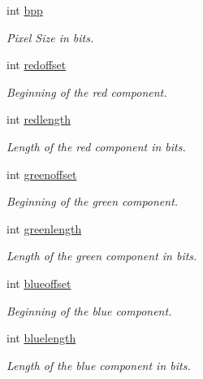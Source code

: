 \begin{DoxyCompactItemize}
\item 
int \hyperlink{structknoxremotedesktop_1_1PixelFormatDetail_a9557bebcc969ba20502ba9d377e085dc}{bpp}
\begin{DoxyCompactList}\small\item\em \-Pixel \-Size in bits. \end{DoxyCompactList}\item 
int \hyperlink{structknoxremotedesktop_1_1PixelFormatDetail_a5c1e26d5565b29732f007ab2f4c89357}{redoffset}
\begin{DoxyCompactList}\small\item\em \-Beginning of the red component. \end{DoxyCompactList}\item 
int \hyperlink{structknoxremotedesktop_1_1PixelFormatDetail_a370e9d8250b35b1f717a71a3737c73d5}{redlength}
\begin{DoxyCompactList}\small\item\em \-Length of the red component in bits. \end{DoxyCompactList}\item 
int \hyperlink{structknoxremotedesktop_1_1PixelFormatDetail_ab334f70ccc320d17dc86a28730954964}{greenoffset}
\begin{DoxyCompactList}\small\item\em \-Beginning of the green component. \end{DoxyCompactList}\item 
int \hyperlink{structknoxremotedesktop_1_1PixelFormatDetail_a87f98032962d81ee015a6a0c56ec6290}{greenlength}
\begin{DoxyCompactList}\small\item\em \-Length of the green component in bits. \end{DoxyCompactList}\item 
int \hyperlink{structknoxremotedesktop_1_1PixelFormatDetail_a7afad9374c4aab4d1fbe2a15396ade47}{blueoffset}
\begin{DoxyCompactList}\small\item\em \-Beginning of the blue component. \end{DoxyCompactList}\item 
int \hyperlink{structknoxremotedesktop_1_1PixelFormatDetail_aeb798caab6629e147478319285d2591f}{bluelength}
\begin{DoxyCompactList}\small\item\em \-Length of the blue component in bits. \end{DoxyCompactList}\item 

\end{DoxyCompactItemize}
